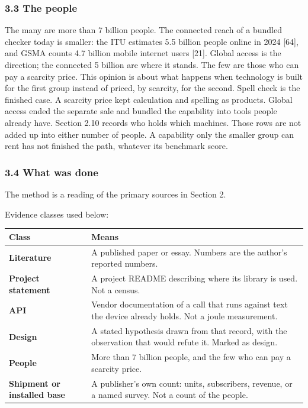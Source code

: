\documentclass[
  10pt,
]{article}
\newcounter{none} %
\begin{document}
\subsubsection{3.3 The people}\label{the-people}

The many are more than 7 billion people. The connected reach of a
bundled checker today is smaller: the ITU estimates 5.5 billion people
online in 2024 {[}64{]}, and GSMA counts 4.7 billion mobile internet
users {[}21{]}. Global access is the direction; the connected 5 billion
are where it stands. The few are those who can pay a scarcity price.
This opinion is about what happens when technology is built for the
first group instead of priced, by scarcity, for the second. Spell check
is the finished case. A scarcity price kept calculation and spelling as
products. Global access ended the separate sale and bundled the
capability into tools people already have. Section 2.10 records who
holds which machines. Those rows are not added up into either number of
people. A capability only the smaller group can rent has not finished
the path, whatever its benchmark score.

\subsubsection{3.4 What was done}\label{what-was-done}

The method is a reading of the primary sources in Section 2.

Evidence classes used below:

{\def\LTcaptype{none} %
\begin{longtable}[]{@{}
  >{\raggedright\arraybackslash}p{}
  >{\raggedright\arraybackslash}p{}@{}}
\toprule\noalign{}
\begin{minipage}[b]{\linewidth}\raggedright
Class
\end{minipage} & \begin{minipage}[b]{\linewidth}\raggedright
Means
\end{minipage} \\
\midrule\noalign{}
\endhead
\bottomrule\noalign{}
\endlastfoot
\textbf{Literature} & A published paper or essay. Numbers are the
author's reported numbers. \\
\textbf{Project statement} & A project README describing where its
library is used. Not a census. \\
\textbf{API} & Vendor documentation of a call that runs against text the
device already holds. Not a joule measurement. \\
\textbf{Design} & A stated hypothesis drawn from that record, with the
observation that would refute it. Marked as design. \\
\textbf{People} & More than 7 billion people, and the few who can pay a
scarcity price. \\
\textbf{Shipment or installed base} & A publisher's own count: units,
subscribers, revenue, or a named survey. Not a count of the people. \\
\end{longtable}
}
\end{document}
